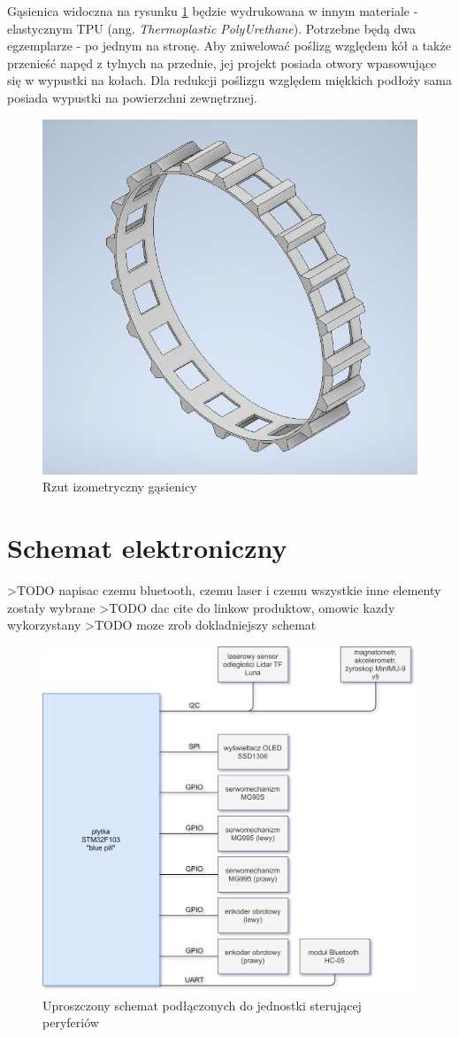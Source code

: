 Gąsienica widoczna na rysunku \ref{fig:tracks} będzie wydrukowana w innym materiale - elastycznym TPU (ang. \emph{Thermoplastic PolyUrethane}). Potrzebne będą dwa egzemplarze - po jednym na stronę. Aby zniwelować poślizg względem kół a także przenieść napęd z tylnych na przednie, jej projekt posiada otwory wpasowujące się w wypustki na kołach. Dla redukcji poślizgu względem miękkich podłoży sama posiada wypustki na powierzchni zewnętrznej.

\begin{figure}[ht]
	\centering
		\includegraphics[width=0.5\linewidth]{rys/tracks-final.png}
	\caption{Rzut izometryczny gąsienicy}
	\label{fig:tracks}
\end{figure}



\section{Schemat elektroniczny}
>TODO napisac czemu bluetooth, czemu laser i czemu wszystkie inne elementy zostały wybrane
>TODO dac cite do linkow produktow, omowic kazdy wykorzystany
>TODO moze zrob dokladniejszy schemat

\begin{figure}[ht]
	\centering
		\includegraphics[width=1\linewidth]{rys/electronic-schematic.png}
	\caption{Uproszczony schemat podłączonych do jednostki sterującej peryferiów}
	\label{fig:electronic-schematic-simplified}
\end{figure}

